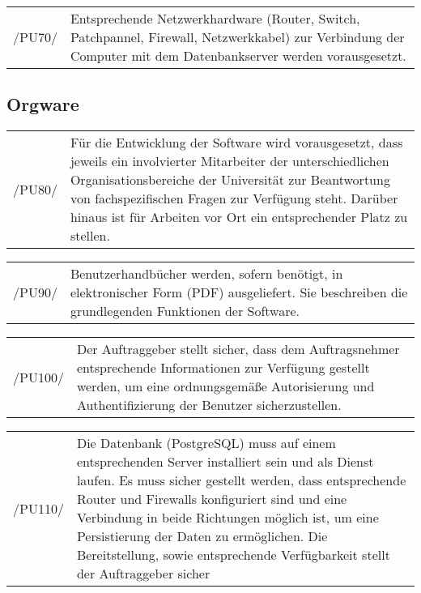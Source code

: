 \begin{tabular}{p{1.5cm}p{14.5cm}}

	 /PU70/	&  Entsprechende Netzwerkhardware (Router, Switch, Patchpannel, Firewall, Netzwerkkabel) zur Verbindung der Computer mit dem Datenbankserver werden vorausgesetzt.\\[0.25cm]


\end{tabular}



\subsection{Orgware}
\label{subsec:orgware}

\begin{tabular}{p{1.5cm}p{14.5cm}}

	 /PU80/	&  Für die Entwicklung der Software wird vorausgesetzt, dass jeweils ein involvierter Mitarbeiter der unterschiedlichen Organisationsbereiche der Universität zur Beantwortung von fachspezifischen Fragen zur Verfügung steht. Darüber hinaus ist für Arbeiten vor Ort ein entsprechender Platz zu stellen.\\[0.25cm]


\end{tabular}

\begin{tabular}{p{1.5cm}p{14.5cm}}

	 /PU90/	&  Benutzerhandbücher werden, sofern benötigt, in elektronischer Form (PDF) ausgeliefert. Sie beschreiben die grundlegenden Funktionen der Software.\\[0.25cm]


\end{tabular}

\begin{tabular}{p{1.5cm}p{14.5cm}}

	 /PU100/	&  Der Auftraggeber stellt sicher, dass dem Auftragsnehmer entsprechende Informationen zur Verfügung gestellt werden, um eine ordnungsgemäße Autorisierung und Authentifizierung der Benutzer sicherzustellen.\\[0.25cm]


\end{tabular}

\begin{tabular}{p{1.5cm}p{14.5cm}}

	 /PU110/	&  Die Datenbank (PostgreSQL) muss auf einem entsprechenden Server installiert sein und als Dienst laufen. Es muss sicher gestellt werden, dass entsprechende Router und Firewalls konfiguriert sind und eine Verbindung in beide Richtungen möglich ist, um eine Persistierung der Daten zu ermöglichen. Die Bereitstellung, sowie entsprechende Verfügbarkeit stellt der Auftraggeber sicher\\[0.25cm]


\end{tabular}

